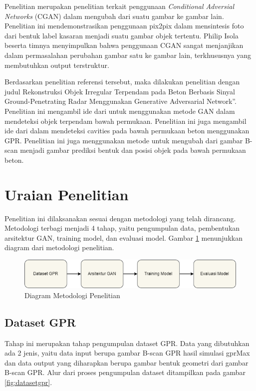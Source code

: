 \documentclass[conference]{IEEEtran}
\begin{document}
Penelitian \cite{b3} merupakan penelitian terkait penggunaan \emph{Conditional Adversial Networks} (CGAN) dalam mengubah dari suatu gambar ke gambar lain. 
Penelitian ini mendemonstrasikan penggunaan pix2pix dalam mensintesis foto dari bentuk label kasaran menjadi suatu gambar objek tertentu. 
Philip Isola beserta timnya menyimpulkan bahwa penggunaan CGAN sangat menjanjikan dalam permasalahan perubahan gambar satu ke gambar lain, terkhususnya yang membutuhkan output terstruktur.

Berdasarkan penelitian referensi tersebut, maka dilakukan penelitian dengan judul Rekonstruksi Objek Irregular Terpendam pada Beton Berbasis Sinyal Ground-Penetrating Radar Menggunakan Generative Adversarial Network”. 
Penelitian ini mengambil ide dari \cite{b1} untuk menggunakan metode GAN dalam mendeteksi objek terpendam bawah permukaan. 
Penelitian ini juga mengambil ide dari \cite{b2} dalam mendeteksi cavities pada bawah permukaan beton menggunakan GPR. 
Penelitian ini juga menggunakan metode \cite{b3} untuk mengubah dari gambar B-scan menjadi gambar prediksi bentuk dan posisi objek pada bawah permukaan beton.

\section{Uraian Penelitian}
Penelitian ini dilaksanakan sesuai dengan metodologi yang telah dirancang. 
Metodologi terbagi menjadi 4 tahap, yaitu pengumpulan data, pembentukan arsitektur GAN, training model, dan evaluasi model. 
Gambar \ref{fig:metodologi} menunjukkan diagram dari metodologi penelitian.

\begin{figure}[ht]
  \centering
  \includegraphics[scale=0.35]{gambar/metodologi.png}
  \caption{Diagram Metodologi Penelitian}
  \label{fig:metodologi}
\end{figure}

\subsection{Dataset GPR}\label{DatasetGPR}
Tahap ini merupakan tahap pengumpulan dataset GPR. 
Data yang dibutuhkan ada 2 jenis, yaitu data input berupa gambar B-scan GPR hasil simulasi gprMax dan data output yang diharapkan berupa gambar bentuk geometri dari gambar B-scan GPR. 
Alur dari proses pengumpulan dataset ditampilkan pada gambar \ref{fig:datasetgpr}.
\end{document}
